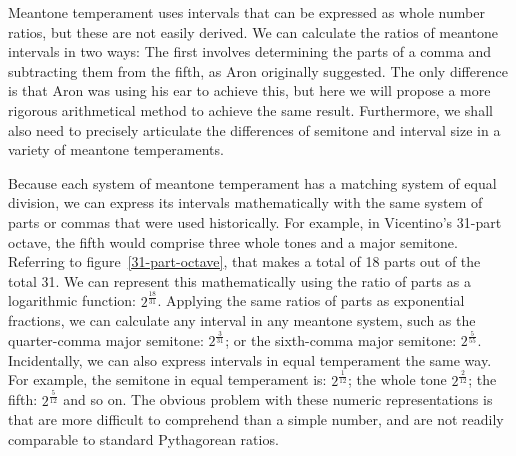 Meantone temperament uses intervals that can be expressed as whole number ratios,
but these are not easily derived.  We can calculate the ratios of meantone intervals in
two ways: The first involves determining the parts of a comma and subtracting them
from the fifth, as Aron originally suggested.  The only difference is that Aron
was using his ear to achieve this, but here we will propose a more rigorous arithmetical
method to achieve the same result.  Furthermore, we shall also need to
precisely articulate the differences of semitone and interval size in a variety of
meantone temperaments.

Because each system of meantone temperament has a matching system of equal
division, we can express its intervals mathematically with the same system of parts or
commas that were used historically.  For example, in Vicentino's 31-part octave, the fifth
would comprise three whole tones and a major semitone. Referring to
figure~\ref{31-part-octave}, that makes a total of 18 parts out of the total 31.  We
can represent this mathematically using the ratio of parts as a logarithmic function:
$2^\frac{18}{31}$.  Applying the same ratios of parts as exponential fractions, we can
calculate any interval in any meantone system, such as the quarter-comma major
semitone: $ 2^\frac{3}{31} $; or the sixth-comma major semitone: $ 2^\frac{5}{55} $.
Incidentally, we can also express intervals in equal temperament the same way.  For
example, the semitone in equal temperament is: $ 2^\frac{1}{12} $; the whole tone $
2^\frac{2}{12} $; the fifth: $ 2^\frac{5}{12} $ and so on.  The obvious problem with these numeric
representations is that are more difficult to comprehend than a simple number, and are
not readily comparable to standard Pythagorean ratios.

